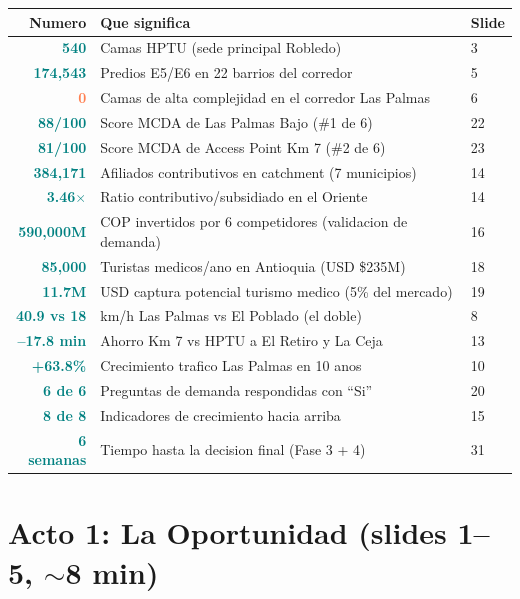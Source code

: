 \documentclass[11pt, a4paper]{article}
\newcommand{\hl}[1]{\textcolor{teal}{\textbf{#1}}}
\newcommand{\dg}[1]{\textcolor{coral}{\textbf{#1}}}
\begin{document}
\begin{center}
\renewcommand{\arraystretch}{1.3}
\begin{tabular}{@{}r l l@{}}
\toprule
\textbf{Numero} & \textbf{Que significa} & \textbf{Slide} \\
\midrule
\rowcolor{bglight}
\hl{540} & Camas HPTU (sede principal Robledo) & 3 \\
\hl{174,543} & Predios E5/E6 en 22 barrios del corredor & 5 \\
\rowcolor{bglight}
\dg{0} & Camas de alta complejidad en el corredor Las Palmas & 6 \\
\hl{88/100} & Score MCDA de Las Palmas Bajo (\#1 de 6) & 22 \\
\rowcolor{bglight}
\hl{81/100} & Score MCDA de Access Point Km 7 (\#2 de 6) & 23 \\
\hl{384,171} & Afiliados contributivos en catchment (7 municipios) & 14 \\
\rowcolor{bglight}
\hl{3.46$\times$} & Ratio contributivo/subsidiado en el Oriente & 14 \\
\hl{590,000M} & COP invertidos por 6 competidores (validacion de demanda) & 16 \\
\rowcolor{bglight}
\hl{85,000} & Turistas medicos/ano en Antioquia (USD \$235M) & 18 \\
\hl{11.7M} & USD captura potencial turismo medico (5\% del mercado) & 19 \\
\rowcolor{bglight}
\hl{40.9 vs 18} & km/h Las Palmas vs El Poblado (el doble) & 8 \\
\hl{--17.8 min} & Ahorro Km 7 vs HPTU a El Retiro y La Ceja & 13 \\
\rowcolor{bglight}
\hl{+63.8\%} & Crecimiento trafico Las Palmas en 10 anos & 10 \\
\hl{6 de 6} & Preguntas de demanda respondidas con ``Si'' & 20 \\
\rowcolor{bglight}
\hl{8 de 8} & Indicadores de crecimiento hacia arriba & 15 \\
\hl{6 semanas} & Tiempo hasta la decision final (Fase 3 + 4) & 31 \\
\bottomrule
\end{tabular}
\end{center}

\section{Acto 1: La Oportunidad (slides 1--5, $\sim$8 min)}
\end{document}
